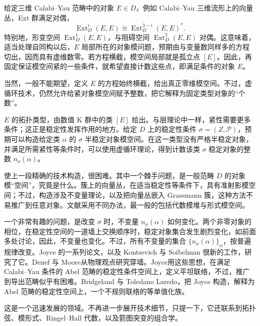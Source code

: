 给定三维 Calabi--Yau 范畴中的对象 $E\in D$，例如 Calabi--Yau 三维流形上的向量丛，Ext 群满足对偶，
\[
\operatorname{Ext}_D^i(E,E)\cong
\operatorname{Ext}_D^{3-i}(E,E)^*.
\]
特别地，形变空间 $\operatorname{Ext}_D^1(E,E)$，与阻碍空间 $\operatorname{Ext}_D^2(E,E)$ 对偶。这意味着，适当处理自同构以后，$E$ 局部所在的对象模问题，预期由与变量数同样多的方程切出，因而具有虚维数零。若方程横截，模空间局部就是孤立点 $[E]$。因此，再固定保证模空间紧的一些条件，就希望直接计数这些点，即满足条件的对象 $E$。

当然，一般不能期望，定义 $E$ 的方程始终横截，给出真正零维模空间。不过，虚循环技术，仍然允许给紧对象模空间赋予整数，把它解释为固定类型对象的“个数”。

$E$ 的拓扑类型，由数值 K 群中的类 $[E]$ 给出。与层理论中一样，紧性需要更多条件；这正是稳定性发挥作用的地方。给定 $D$ 上的稳定性条件 $\sigma=(Z,\mathcal{P})$，预期可以构造给定类 $\alpha$ 的 $\sigma$ 半稳定对象模空间。在这一类型没有严格半稳定对象，并满足所需紧性等条件时，可以使用虚循环理论，得到计数该类 $\sigma$ 稳定对象的整数 $n_\sigma(\alpha)$。

使上一段精确的技术构造，很困难。其中一个棘手问题，是一般范畴 $D$ 的对象模“空间”，究竟是什么。簇上的向量丛，在适当稳定性等条件下，具有准射影模空间；不过，构造涉及不变量理论，以及把向量丛嵌入 Grassmann 簇，这种方法不易推广到任意对象。文献采用不同办法，最一般的包括代数模堆与形式模空间。

一个非常有趣的问题，是改变 $\sigma$ 时，不变量 $n_\sigma(\alpha)$ 如何变化。两个非零对象的相位，在稳定性空间的一道墙上交换顺序时，稳定对象集合发生剧烈变化，如前面多处讨论，因此，不变量也变化。不过，所有不变量的集合 $\{n_\sigma(\alpha)\}_\alpha$，按普遍规律改变。Joyce 的一系列论文，以及 Kontsevich 与 Soibelman 很新的工作，研究了它。Denef 与 Moore从物理观点研究穿墙。Joyce用这些思想，在满足 Calabi--Yau 条件的 Abel 范畴的稳定性条件空间上，定义平坦联络，不过，推广到导出范畴似乎有困难。Bridgeland 与 Toledano Laredo，把 Joyce 构造，解释为 Abel 范畴的稳定性空间上，一个不规则联络的等单值化族。

这是一个迅速发展的领域。不再进一步展开技术细节，只提一下，它还联系到拓扑弦、模形式、Ringel--Hall 代数，以及箭图突变的组合学。

